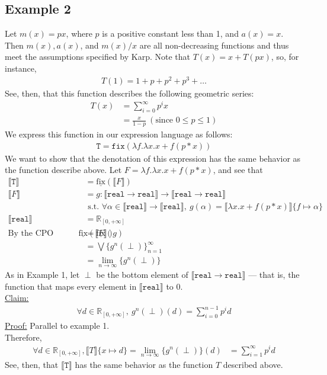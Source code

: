 \documentclass{westhesis}
\newcommand{\R}{\mathbb{R}}
\begin{document}
\subsection{Example 2}
Let $m(x) = px$, where $p$ is a positive constant less than 1, and $a(x) = x$. Then $m(x), a(x)$, and $m(x)/x$ are all non-decreasing functions and thus meet the assumptions specified by Karp. Note that $T(x) = x + T(px)$, so, for instance,
\begin{align*}
T(1) = 1 + p + p^2 + p^3 + \ldots
\end{align*}
See, then, that this function describes the following geometric series:
\begin{align*}
T(x) &= \sum_{i=0}^{\infty} p^ix \\ 
&= \frac{x}{1 - p} \ (\text{since } 0 \leq p \leq 1)
\end{align*}
We express this function in our expression language as follows:
\begin{align*}
 \texttt{T} = \texttt{fix}(\lambda f. \lambda x.x + f (p * x))
 \end{align*}
We want to show that the denotation of this expression has the same behavior as the function describe above. Let $F = \lambda f. \lambda x.x + f (p * x)$, and see that 
 \begin{align*}
 \llbracket \texttt{T} \rrbracket &= \underline{\text{fix}}(\llbracket F \rrbracket) \\
 \llbracket F \rrbracket &= g : \llbracket \texttt{real} \rightarrow \texttt{real}\rrbracket \rightarrow \llbracket \texttt{real} \rightarrow \texttt{real}\rrbracket \\ &\text{ \ \ \ s.t. } \forall \alpha \in \llbracket \texttt{real}\rrbracket \rightarrow \llbracket \texttt{real}\rrbracket, \ 
 g(\alpha) = \llbracket \lambda x.x + f (p * x)\rrbracket\{f \mapsto \alpha\} \\
 \llbracket \texttt{real}\rrbracket &= \R_{[0, +\infty]}  
 \\\text{By the CPO fixpoint theorem, } \underline{\text{fix}}(\llbracket F \rrbracket) &= \underline{\text{fix}}(g) \\
&= \bigvee\{g^n (\perp)\}^{\infty}_{n=1} \\
&= \lim_{n \to \infty}\{g^n (\perp)\}
 \end{align*}
As in Example 1, let $\perp$ be the bottom element of $\llbracket \texttt{real} \rightarrow \texttt{real} \rrbracket$ --- that is, 
the function that maps every element in $\llbracket \texttt{real} \rrbracket$ to $0$. \\
 \underline{Claim:}
 \begin{align*}
 \forall d \in \R_{[0, +\infty]}, \ g^n(\perp)(d) = \sum_{i = 0}^{n-1}p^{i}d
 \end{align*}
 \underline{Proof:} Parallel to example 1. \\
Therefore, 
 \begin{align*}
 \forall d \in \R_{[0,+\infty]}, \llbracket T \rrbracket\{x \mapsto d \} =  \lim_{n \to \infty}\{g^n (\perp)\}(d) &= \sum_{i=1}^{\infty} 
 p^{i}d 
 \end{align*}
 See, then, that $\llbracket \texttt{T} \rrbracket$ has the same behavior as the function $T$ described above.
\end{document}
